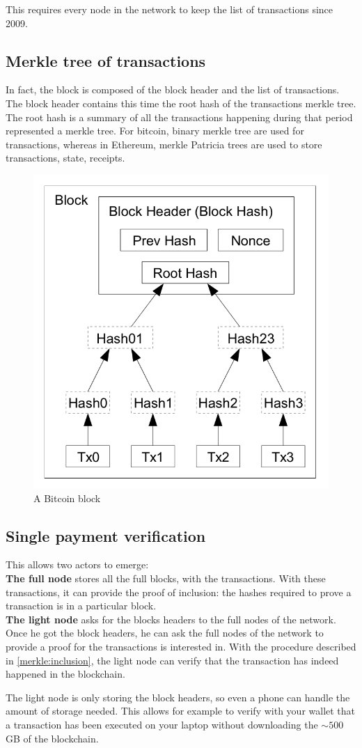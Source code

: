 This requires every node in the network to keep the list of transactions since 2009.

\subsection{Merkle tree of transactions}
In fact, the block is composed of the block header and the list of transactions. The block header contains this time the root hash of the transactions merkle tree.
The root hash is a summary of all the transactions happening during that period represented a merkle tree. For bitcoin, binary merkle tree are used for transactions, whereas in Ethereum, merkle Patricia trees are used to store transactions, state, receipts. 
\begin{figure}[H]
    \centering
\includegraphics[width=0.4\linewidth]{background/blockmerkle.png}
    \caption{A Bitcoin\cite{Nakamoto..09} block}
    \label{fig:blockmerkle}
\end{figure}

\subsection{Single payment verification}
This allows two actors to emerge: \\
\textbf{The full node} stores all the full blocks, with the transactions. With these transactions, it can provide the proof of inclusion: the hashes required to prove a transaction is in a particular block. \\
\textbf{The light node } asks for the blocks headers to the full nodes of the network. Once he got the block headers, he can ask the full nodes of the network to provide a proof for the transactions is interested in. With the procedure described in \ref{merkle:inclusion}, the light node can verify that the transaction has indeed happened in the blockchain.

The light node is only storing the block headers, so even a phone can handle the amount of storage needed. This allows for example to verify with your wallet that a transaction has been executed  on your laptop without downloading the $\sim 500$GB of the blockchain.




